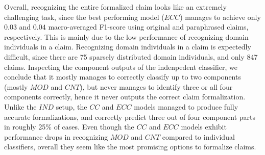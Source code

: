 Overall, recognizing the entire formalized claim looks like an extremely
challenging task, since the best performing model ($ECC$) manages to achieve
only $0.03$ and $0.04$ macro-averaged F1-score
using original and paraphrased claims, respectively. This is mainly due
to the low performance of recognizing domain individuals in a claim.
Recognizing domain individuals in a claim is expectedly difficult, since there
are 75 sparsely distributed domain individuals, and only 847 claims.
Inspecting the component outputs of the indenpedent classifier, we conclude
that it mostly manages to correctly classify up to two components (mostly $MOD$
and $CNT$), but never manages to identify three or all four
components correctly, hence it never outputs the correct claim formalization. 
Unlike the $IND$ setup, the $CC$ and $ECC$ models managed to produce fully
accurate formalizations, and correctly predict three out of four component parts
in roughly 25\% of cases.
Even though the $CC$ and $ECC$ models exhibit performance drops in recognizing
$MOD$ and $CNT$ compared to individual classifiers, overall they seem like the most
promising options to formalize claims. 

